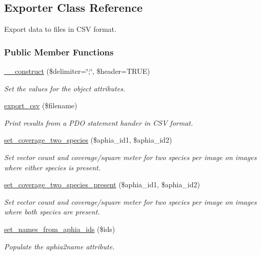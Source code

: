 \hypertarget{classExporter}{\subsection{Exporter Class Reference}
\label{classExporter}
}


Export data to files in C\-S\-V format.  


\subsubsection*{Public Member Functions}
\begin{DoxyCompactItemize}
\item 
\hyperlink{classExporter_aef9e8f9d7dd29d6133b71acdc24e4ef6}{\-\_\-\-\_\-construct} (\$delimiter=\char`\"{};\char`\"{}, \$header=T\-R\-U\-E)
\begin{DoxyCompactList}\small\item\em Set the values for the object attributes. \end{DoxyCompactList}\item 
\hyperlink{classExporter_a63e4609c0612518bb77fd8b05693f92a}{export\-\_\-csv} (\$filename)
\begin{DoxyCompactList}\small\item\em Print results from a P\-D\-O statement hander in C\-S\-V format. \end{DoxyCompactList}\item 
\hyperlink{classExporter_aa2afe95206f1731839936a65a0e2cf97}{set\-\_\-coverage\-\_\-two\-\_\-species} (\$aphia\-\_\-id1, \$aphia\-\_\-id2)
\begin{DoxyCompactList}\small\item\em Set vector count and coverage/square meter for two species per image on images where either species is present. \end{DoxyCompactList}\item 
\hyperlink{classExporter_a029e2313283f605eeda5ebb46ceb4038}{set\-\_\-coverage\-\_\-two\-\_\-species\-\_\-present} (\$aphia\-\_\-id1, \$aphia\-\_\-id2)
\begin{DoxyCompactList}\small\item\em Set vector count and coverage/square meter for two species per image on images where both species are present. \end{DoxyCompactList}\item 
\hyperlink{classExporter_aef6631756a775063a2f55d7d8475c8cc}{set\-\_\-names\-\_\-from\-\_\-aphia\-\_\-ids} (\$ids)
\begin{DoxyCompactList}\small\item\em Populate the aphia2name attribute. \end{DoxyCompactList}\end{DoxyCompactItemize}
